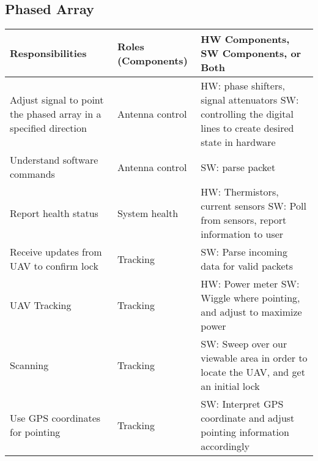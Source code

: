 \documentclass[RRC.tex]{subfiles}
\begin{document}
\bigskip

\subsection{\Large Phased Array}
\begin{center}
	\begin{tabular}{ | p{5cm} | p{5cm} | p{5cm} |}
		\hline
		Responsibilities & Roles (Components) & HW Components, SW Components, or Both \\ \hline	
		Adjust signal to point the phased array in a specified direction & Antenna control & HW: phase shifters, signal attenuators SW: controlling the digital lines to create desired state in hardware   \\ \hline
		Understand software commands & Antenna control & SW: parse packet  \\ \hline
		Report health status & System health & HW: Thermistors, current sensors SW: Poll from sensors, report information to user \\ \hline
		Receive updates from UAV to confirm lock & Tracking & SW: Parse incoming data for valid packets \\ \hline
		UAV Tracking & Tracking & HW: Power meter SW: Wiggle where pointing, and adjust to maximize power \\ \hline
		Scanning & Tracking & SW: Sweep over our viewable area in order to locate the UAV, and get an initial lock \\ \hline
		Use GPS coordinates for pointing & Tracking & SW: Interpret GPS coordinate and adjust pointing information accordingly \\ \hline
		
		
		
	\end{tabular}
\end{center}
\end{document}
